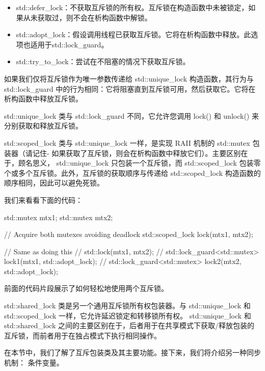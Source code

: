 \begin{itemize}
\item
std::defer\_lock：不获取互斥锁的所有权。互斥锁在构造函数中未被锁定，如果从未获取过，则不会在析构函数中解锁。

\item
std::adopt\_lock：假设调用线程已获取互斥锁。它将在析构函数中释放。此选项也适用于std::lock\_guard。

\item
std::try\_to\_lock：尝试在不阻塞的情况下获取互斥锁。
\end{itemize}

如果我们仅将互斥锁作为唯一参数传递给 std::unique\_lock 构造函数，其行为与 std::lock\_guard 中的行为相同：它将阻塞直到互斥锁可用，然后获取它。它将在析构函数中释放互斥锁。

std::unique\_lock 类与 std::lock\_guard 不同，它允许您调用 lock() 和 unlock() 来分别获取和释放互斥锁。


std::scoped\_lock 类与 std::unique\_lock 一样，是实现 RAII 机制的 std::mutex 包装器（请记住- 如果获取了互斥锁，则会在析构函数中释放它们）。主要区别在于，顾名思义， std::unique\_lock 只包装一个互斥锁，而 std::scoped\_lock 包装零个或多个互斥锁。此外，互斥锁的获取顺序与传递给 std::scoped\_lock 构造函数的顺序相同，因此可以避免死锁。

我们来看看下面的代码：

\begin{cpp}
std::mutex mtx1;
std::mutex mtx2;

// Acquire both mutexes avoiding deadlock
std::scoped_lock lock(mtx1, mtx2);

// Same as doing this
// std::lock(mtx1, mtx2);
// std::lock_guard<std::mutex> lock1(mtx1, std::adopt_lock);
// std::lock_guard<std::mutex> lock2(mtx2, std::adopt_lock);
\end{cpp}

前面的代码片段展示了如何轻松地使用两个互斥锁。


std::shared\_lock 类是另一个通用互斥锁所有权包装器。与 std::unique\_lock 和 std::scoped\_lock 一样，它允许延迟锁定和转移锁所有权。 std::unique\_lock 和 std::shared\_lock 之间的主要区别在于，后者用于在共享模式下获取/释放包装的互斥锁，而前者用于在独占模式下执行相同操作。

在本节中，我们了解了互斥包装类及其主要功能。接下来，我们将介绍另一种同步机制： 条件变量。













